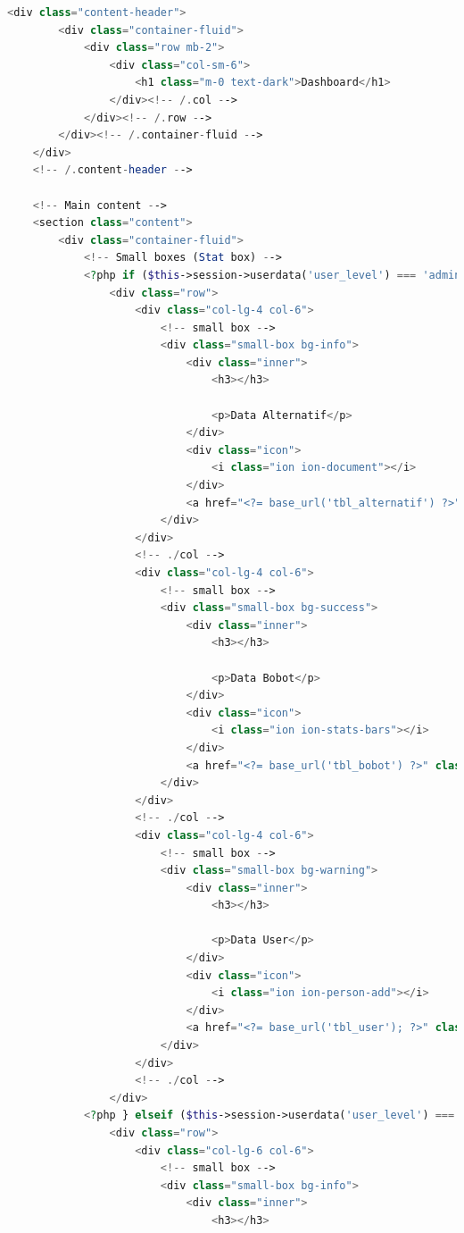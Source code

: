 \begin{lstlisting}[language=PHP]
	<div class="content-header">
	    <div class="container-fluid"> 
	        <div class="row mb-2">  
	            <div class="col-sm-6">  
	                <h1 class="m-0 text-dark">Dashboard</h1>  
	            </div><!-- /.col -->  
	        </div><!-- /.row -->  
	    </div><!-- /.container-fluid -->  
	</div>  
	<!-- /.content-header -->  
	  
	<!-- Main content -->  
	<section class="content">  
	    <div class="container-fluid">  
	        <!-- Small boxes (Stat box) -->  
	        <?php if ($this->session->userdata('user_level') === 'admin') { ?>  
	            <div class="row">  
	                <div class="col-lg-4 col-6">  
	                    <!-- small box -->  
	                    <div class="small-box bg-info">  
	                        <div class="inner"> 
	                            <h3></h3>  
	  
	                            <p>Data Alternatif</p>  
	                        </div>  
	                        <div class="icon">  
	                            <i class="ion ion-document"></i>  
	                        </div>  
	                        <a href="<?= base_url('tbl_alternatif') ?>" class="small-box-footer">More info <i class="fas fa-arrow-circle-right"></i></a>  
	                    </div> 
	                </div>  
	                <!-- ./col -->  
	                <div class="col-lg-4 col-6">  
	                    <!-- small box -->  
	                    <div class="small-box bg-success">  
	                        <div class="inner">  
	                            <h3></h3>  
	  
	                            <p>Data Bobot</p>  
	                        </div>  
	                        <div class="icon">  
	                            <i class="ion ion-stats-bars"></i>  
	                        </div>  
	                        <a href="<?= base_url('tbl_bobot') ?>" class="small-box-footer">More info <i class="fas fa-arrow-circle-right"></i></a>  
	                    </div>  
	                </div>  
	                <!-- ./col -->  
	                <div class="col-lg-4 col-6">  
	                    <!-- small box -->  
	                    <div class="small-box bg-warning">  
	                        <div class="inner">  
	                            <h3></h3>  
	  
	                            <p>Data User</p>  
	                        </div>  
	                        <div class="icon">  
	                            <i class="ion ion-person-add"></i>  
	                        </div>  
	                        <a href="<?= base_url('tbl_user'); ?>" class="small-box-footer">More info <i class="fas fa-arrow-circle-right"></i></a> 
	                    </div>  
	                </div>  
	                <!-- ./col -->  
	            </div>  
	        <?php } elseif ($this->session->userdata('user_level') === 'user') { ?>  
	            <div class="row">  
	                <div class="col-lg-6 col-6">  
	                    <!-- small box -->  
	                    <div class="small-box bg-info">  
	                        <div class="inner">  
	                            <h3></h3>  
	  

\end{lstlisting}
